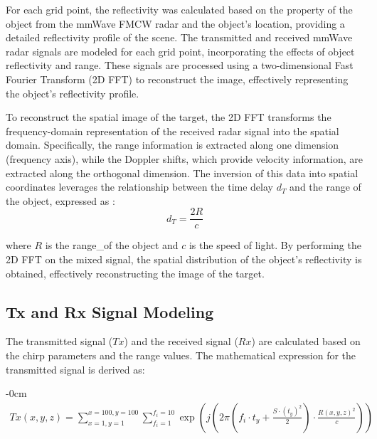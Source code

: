 \documentclass[journal,article,submit,pdftex,moreauthors]{Definitions/mdpi}
\begin{document}
For each grid point, the reflectivity was calculated based on the property of the object from the mmWave FMCW radar and the object's location, providing a detailed reflectivity profile of the scene. The transmitted and received mmWave radar signals are modeled for each grid point, incorporating the effects of object reflectivity and range. These signals are processed using a two-dimensional Fast Fourier Transform (2D FFT) to reconstruct the image, effectively representing the object's reflectivity profile.

To reconstruct the spatial image of the target, the 2D FFT transforms the frequency-domain representation of the received radar signal into the spatial domain. Specifically, the range information is extracted along one dimension (frequency axis), while the Doppler shifts, which provide velocity information, are extracted along the orthogonal dimension. The inversion of this data into spatial coordinates leverages the relationship between the time delay \(d_T\) and the range of the object, expressed as \cite{liu2021deep, park2020high}:
\begin{equation}
    d_T = \frac{2R}{c}
\end{equation}

where \(R\) is the range\_of the object and \(c\) is the speed of light. By performing the 2D FFT on the mixed signal, the spatial distribution of the object's reflectivity is obtained, effectively reconstructing the image of the target.

\subsection{Tx and Rx Signal Modeling}
The transmitted signal (\(Tx\)) and the received signal (\( Rx\)) are calculated based on the chirp parameters and the range values. The mathematical expression for the transmitted signal is derived as:

\begin{adjustwidth}{-\extralength}{0cm}
\begin{equation}
   \begin{aligned}
    Tx(x, y, z) = \sum_{x=1, y=1}^{x=100, y=100} \sum_{f_i=1}^{f_i =10} \exp \left( j \left( 2 \pi \left( f_i \cdot t_y + 
    \frac{S \cdot (t_y)^2}{2} \right) \cdot \frac{R(x, y, z)^2}{c} \right) \right)
    \end{aligned}
\end{equation}
\end{adjustwidth}
\end{document}
